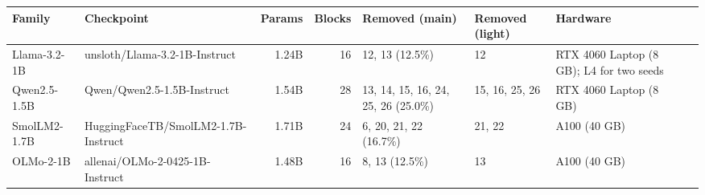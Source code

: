 \begin{tabular}{llrrllll}
\toprule
Family & Checkpoint & Params & Blocks & Removed (main) & Removed (light) & Hardware \\
\midrule
Llama-3.2-1B & unsloth/Llama-3.2-1B-Instruct & 1.24B & 16 & 12, 13 (12.5\%) & 12 & RTX 4060 Laptop (8 GB); L4 for two seeds \\
Qwen2.5-1.5B & Qwen/Qwen2.5-1.5B-Instruct & 1.54B & 28 & 13, 14, 15, 16, 24, 25, 26 (25.0\%) & 15, 16, 25, 26 & RTX 4060 Laptop (8 GB) \\
SmolLM2-1.7B & HuggingFaceTB/SmolLM2-1.7B-Instruct & 1.71B & 24 & 6, 20, 21, 22 (16.7\%) & 21, 22 & A100 (40 GB) \\
OLMo-2-1B & allenai/OLMo-2-0425-1B-Instruct & 1.48B & 16 & 8, 13 (12.5\%) & 13 & A100 (40 GB) \\
\bottomrule
\end{tabular}
